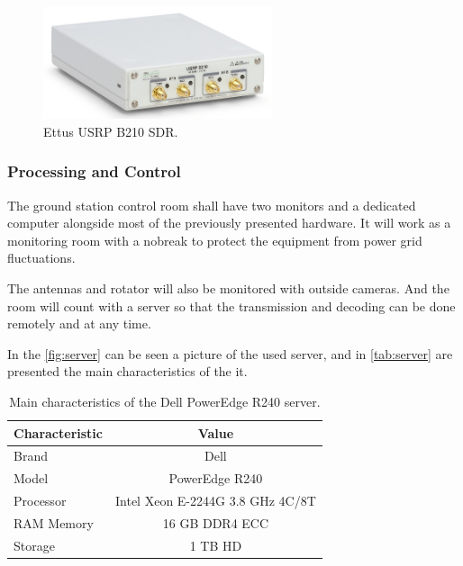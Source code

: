 \begin{figure}[!ht]
    \begin{center}
        \includegraphics[width=0.6\textwidth]{figures/usrp-b210.jpg}
        \caption{Ettus USRP B210 SDR.}
        \label{fig:usrp-b210}
    \end{center}
\end{figure}

\subsubsection{Processing and Control}

The ground station control room shall have two monitors and a dedicated computer alongside most of the previously presented hardware. It will work as a monitoring room with a nobreak to protect the equipment from power grid fluctuations. 

The antennas and rotator will also be monitored with outside cameras. And the room will count with a server so that the transmission and decoding can be done remotely and at any time.

In the \autoref{fig:server} can be seen a picture of the used server, and in \autoref{tab:server} are presented the main characteristics of the it.

\begin{table}[ht]
    \centering
    \begin{tabular}{lc}
        \toprule[1.5pt]
        \textbf{Characteristic} & \textbf{Value} \\
        \midrule
        Brand                   & Dell \\
        Model                   & PowerEdge R240 \\
        Processor               & Intel Xeon E-2244G 3.8 GHz 4C/8T \\
        RAM Memory              & 16 GB DDR4 ECC \\
        Storage                 & 1 TB HD \\
        \bottomrule[1.5pt]
    \end{tabular}
    \caption{Main characteristics of the Dell PowerEdge R240 server.}
    \label{tab:server}
\end{table}

